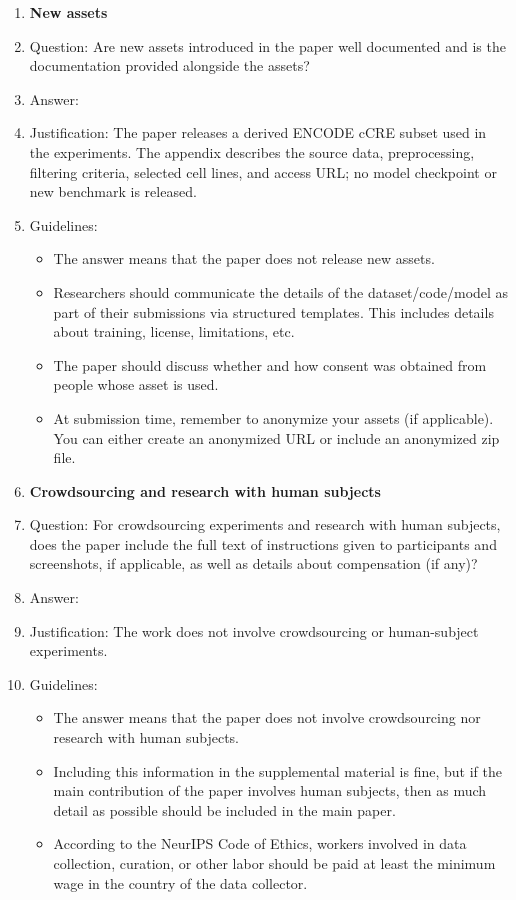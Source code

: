 \documentclass{article}
\begin{document}
\begin{enumerate}
\item {\bf New assets}
    \item[] Question: Are new assets introduced in the paper well documented and is the documentation provided alongside the assets?
    \item[] Answer: \answerYes{} %
    \item[] Justification: The paper releases a derived ENCODE cCRE subset used in the experiments. The appendix describes the source data, preprocessing, filtering criteria, selected cell lines, and access URL; no model checkpoint or new benchmark is released.
    \item[] Guidelines:
    \begin{itemize}
        \item The answer \answerNA{} means that the paper does not release new assets.
        \item Researchers should communicate the details of the dataset\slash code\slash model as part of their submissions via structured templates. This includes details about training, license, limitations, etc. 
        \item The paper should discuss whether and how consent was obtained from people whose asset is used.
        \item At submission time, remember to anonymize your assets (if applicable). You can either create an anonymized URL or include an anonymized zip file.
    \end{itemize}

\item {\bf Crowdsourcing and research with human subjects}
    \item[] Question: For crowdsourcing experiments and research with human subjects, does the paper include the full text of instructions given to participants and screenshots, if applicable, as well as details about compensation (if any)? 
    \item[] Answer: \answerNA{} %
    \item[] Justification: The work does not involve crowdsourcing or human-subject experiments.
    \item[] Guidelines:
    \begin{itemize}
        \item The answer \answerNA{} means that the paper does not involve crowdsourcing nor research with human subjects.
        \item Including this information in the supplemental material is fine, but if the main contribution of the paper involves human subjects, then as much detail as possible should be included in the main paper. 
        \item According to the NeurIPS Code of Ethics, workers involved in data collection, curation, or other labor should be paid at least the minimum wage in the country of the data collector. 
    \end{itemize}


\end{enumerate}
\end{document}
